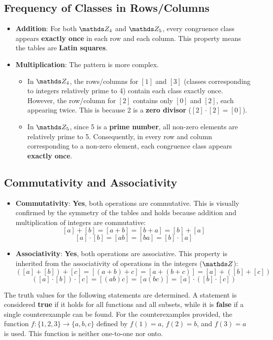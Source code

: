 \documentclass[10pt]{article}
\theoremstyle{definition}
\theoremstyle{plain}
\numberwithin{equation}{section}
\begin{document}
\subsection*{Frequency of Classes in Rows/Columns}
\begin{itemize}
  \item \textbf{Addition}: For both $\setZ_4$ and $\setZ_5$, every congruence class appears \textbf{exactly once} in each row and each column. This property means the tables are \textbf{Latin squares}.
  \item \textbf{Multiplication}: The pattern is more complex.
  \begin{itemize}
    \item In $\setZ_4$, the rows/columns for $[1]$ and $[3]$ (classes corresponding to integers relatively prime to 4) contain each class exactly once. However, the row/column for $[2]$ contains only $[0]$ and $[2]$, each appearing twice. This is because 2 is a \textbf{zero divisor} ($[2] \cdot [2] = [0]$).
    \item In $\setZ_5$, since 5 is a \textbf{prime number}, all non-zero elements are relatively prime to 5. Consequently, in every row and column corresponding to a non-zero element, each congruence class appears \textbf{exactly once}.
  \end{itemize}
\end{itemize}

\subsection*{Commutativity and Associativity}
\begin{itemize}
  \item \textbf{Commutativity}: \textbf{Yes}, both operations are commutative. This is visually confirmed by the symmetry of the tables and holds because addition and multiplication of integers are commutative:
  \[ [a] + [b] = [a+b] = [b+a] = [b] + [a] \]
  \[ [a] \cdot [b] = [ab] = [ba] = [b] \cdot [a] \]
  \item \textbf{Associativity}: \textbf{Yes}, both operations are associative. This property is inherited from the associativity of operations in the integers ($\setZ$):
  \[ ([a] + [b]) + [c] = [(a+b)+c] = [a+(b+c)] = [a] + ([b] + [c]) \]
  \[ ([a] \cdot [b]) \cdot [c] = [(ab)c] = [a(bc)] = [a] \cdot ([b] \cdot [c]) \]
\end{itemize}

\newpage


The truth values for the following statements are determined. A statement is considered \textbf{true} if it holds for all functions and all subsets, while it is \textbf{false} if a single counterexample can be found. For the counterexamples provided, the function $f: \{1, 2, 3\} \to \{a, b, c\}$ defined by $f(1)=a$, $f(2)=b$, and $f(3)=a$ is used. This function is neither one-to-one nor onto.
\end{document}
